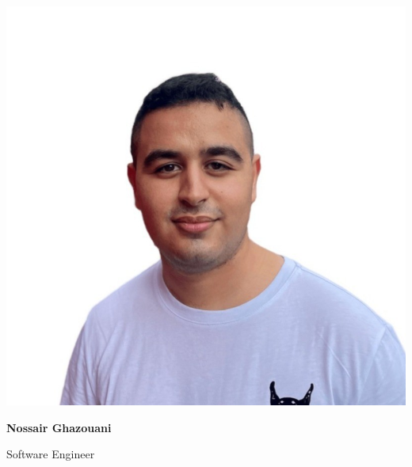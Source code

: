 \documentclass[9pt]{developercv} %
\begin{document}


\begin{minipage}[t]{0.12\textwidth} %
	\vspace{-\baselineskip} %
	
	\begin{center}
		\includegraphics[width=\linewidth]{photo.jpg}
	\end{center}
\end{minipage}
\hfill %
\begin{minipage}[t]{0.2\textwidth} %
	\vspace{-\baselineskip} %
	
	{\Large\textbf{Nossair Ghazouani}} %
	
	\vspace{3pt} %
	
	{\large Software Engineer} %
\end{minipage}
\end{document}
